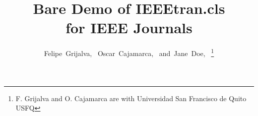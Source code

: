 \documentclass[journal]{IEEEtran}
\begin{document}



\title{Bare Demo of IEEEtran.cls\\ for IEEE Journals}


%

\author{Felipe~Grijalva,~
        Oscar~Cajamarca,~
        and~Jane~Doe,~%
\thanks{F. Grijalva and O. Cajamarca are with Universidad San Francisco de Quito USFQ}%
}

% 
%
\end{document}

